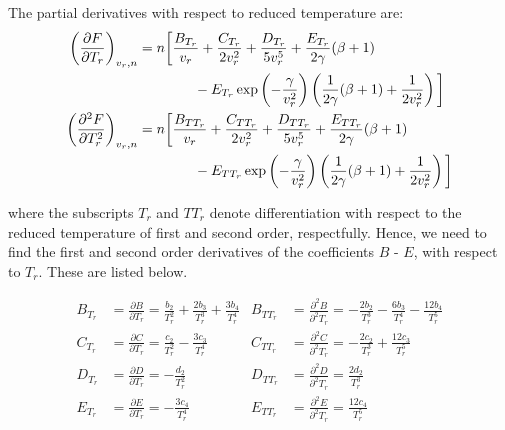 \documentclass[english]{../thermomemo/thermomemo}
\numberwithin{equation}{section}
\begin{document}
The partial derivatives with respect to reduced temperature are:
\begin{align}
  \phantom{\left( \frac{\partial^2 F}{\partial T_r^2} \right)_{v_r, n}}
  & \begin{aligned} \label{eq:F_Tr}
    \mathllap{\left( \frac{\partial F}{\partial T_r} \right)_{v_r, n}}
   & = n \bigg[ \frac{B_{T_r}}{v_r} + \frac{C_{T_r}}{2v_r^2} + \frac{D_{T_r}}{5v_r^5} + \frac{E_{T_r}}{2\gamma} (\beta + 1) \\
    & \qquad \qquad- E_{T_r}\exp \left(-\frac{\gamma}{v_r^2} \right) \left(\frac{1}{2\gamma} (\beta + 1) + \frac{1}{2v_r^2} \right)  \bigg]
  \end{aligned} \\
  & \begin{aligned} \label{eq:F_TrTr}
    \mathllap{\left( \frac{\partial^2 F}{\partial T_r^2} \right)_{v_r, n}}
    & = n \bigg[ \frac{B_{TT_r}}{v_r} + \frac{C_{TT_r}}{2v_r^2} + \frac{D_{TT_r}}{5v_r^5} + \frac{E_{TT_r}}{2\gamma} (\beta + 1) \\
	& \qquad \qquad- E_{TT_r}\exp \left(-\frac{\gamma}{v_r^2} \right) \left(\frac{1}{2\gamma} (\beta + 1) + \frac{1}{2v_r^2} \right)  \bigg]
  \end{aligned}
\end{align}

where the subscripts $T_r$ and $TT_r$ denote differentiation with respect to the reduced temperature of first and second order, respectfully. Hence, we need to find the first and second order derivatives of the coefficients $B$ - $E$, with respect to $T_r$. These are listed below.

\begin{align}
\label{eq:B_Tr}
B_{T_r} & = \frac{\partial B}{\partial T_r} = \frac{b_2}{T_r^2} + \frac{2b_3}{T_r^3} + \frac{3b_4}{T_r^4}  
& B_{TT_r} & = \frac{\partial^2 B}{\partial^2 T_r} = -\frac{2b_2}{T_r^3} - \frac{6b_3}{T_r^4} -\frac{12b_4}{T_r^5} \\
C_{T_r} & = \frac{\partial C}{\partial T_r} = \frac{c_2}{T_r^2} - \frac{3c_3}{T_r^4} 
& C_{TT_r} & = \frac{\partial^2 C}{\partial^2 T_r} = - \frac{2c_2}{T_r^3} + \frac{12c_3}{T_r^5} \\
D_{T_r} &= \frac{\partial D}{\partial T_r} = -\frac{d_2}{T_r^2} 
& D_{TT_r} & = \frac{\partial^2 D}{\partial^2 T_r} = \frac{2d_2}{T_r^3} \\
E_{T_r} & = \frac{\partial E}{\partial T_r} = -\frac{3c_4}{T_r^4} 
& E_{TT_r} & = \frac{\partial^2 E}{\partial^2 T_r} = \frac{12c_4}{T_r^5} \label{eq:E_TrTr}
\end{align}
\end{document}
